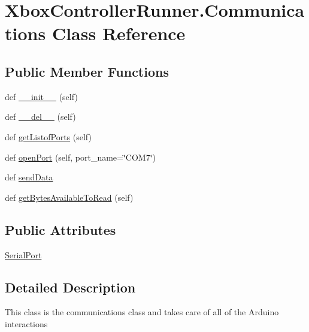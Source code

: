\hypertarget{class_xbox_controller_runner_1_1_communications}{}\section{Xbox\+Controller\+Runner.\+Communications Class Reference}
\label{class_xbox_controller_runner_1_1_communications}
\subsection*{Public Member Functions}
\begin{DoxyCompactItemize}
\item 
def \mbox{\hyperlink{class_xbox_controller_runner_1_1_communications_af73bf2f7be5eddad52652303f0c54bd6}{\+\_\+\+\_\+init\+\_\+\+\_\+}} (self)
\item 
def \mbox{\hyperlink{class_xbox_controller_runner_1_1_communications_a5826b178d9c90e3b89156704d48e7a4f}{\+\_\+\+\_\+del\+\_\+\+\_\+}} (self)
\item 
def \mbox{\hyperlink{class_xbox_controller_runner_1_1_communications_a091dd6d34bf96a15c67a8e87d7333515}{get\+Listof\+Ports}} (self)
\item 
def \mbox{\hyperlink{class_xbox_controller_runner_1_1_communications_a5a633896f720056b6d07bfbe0e435e16}{open\+Port}} (self, port\+\_\+name=\char`\"{}C\+O\+M7\char`\"{})
\item 
def \mbox{\hyperlink{class_xbox_controller_runner_1_1_communications_a7bde537bb8a2b4079a8957a2a9f4331e}{send\+Data}}
\item 
def \mbox{\hyperlink{class_xbox_controller_runner_1_1_communications_a100a64229f39d8fa0fb7801a22104412}{get\+Bytes\+Available\+To\+Read}} (self)
\end{DoxyCompactItemize}
\subsection*{Public Attributes}
\begin{DoxyCompactItemize}
\item 
\mbox{\hyperlink{class_xbox_controller_runner_1_1_communications_a37dd3a39cfb67c171a4f639e9c24176a}{Serial\+Port}}
\end{DoxyCompactItemize}


\subsection{Detailed Description}
\begin{DoxyVerb}This class is the communications class and takes care of all of the Arduino interactions\end{DoxyVerb}
 

